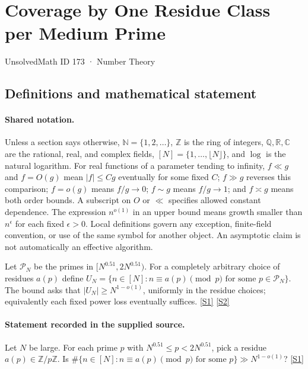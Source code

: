 \documentclass[11pt,a4paper]{article}
\newcommand{\N}{\mathbb{N}}
\newcommand{\Z}{\mathbb{Z}}
\newcommand{\Q}{\mathbb{Q}}
\newcommand{\R}{\mathbb{R}}
\newcommand{\C}{\mathbb{C}}
\newcommand{\sref}[2]{\hyperlink{source:#1:#2}{[S#2]}}
\begin{document}

\setcounter{section}{172}

\section{Coverage by One Residue Class per Medium Prime}\label{173}

{\small\sffamily UnsolvedMath ID 173 · Number Theory}

\subsection{Definitions and mathematical statement}

\paragraph{Shared notation.}Unless a section says otherwise, $\N=\{1,2,\ldots\}$,
$\Z$ is the ring of integers, $\Q,\R,\C$ are the rational, real, and complex
fields, $[N]=\{1,\ldots,\lfloor N\rfloor\}$, and $\log$ is the natural
logarithm. For real functions of a parameter tending to infinity,
$f\ll g$ and $f=O(g)$ mean $|f|\leq Cg$ eventually for some fixed $C$;
$f\gg g$ reverses this comparison; $f=o(g)$ means $f/g\to0$;
$f\sim g$ means $f/g\to1$; and $f\asymp g$ means both order bounds.
A subscript on $O$ or $\ll$ specifies allowed constant dependence.
The expression $n^{o(1)}$ in an upper bound means growth smaller than
$n^\epsilon$ for each fixed $\epsilon>0$. Local definitions govern any
exception, finite-field convention, or use of the same symbol for another
object. An asymptotic claim is not automatically an effective algorithm.



Let $\mathcal P_N$ be the primes in $[N^{0.51},2N^{0.51})$. For a completely arbitrary choice of residues $a(p)$ define $U_N=\{n\in[N]:n\equiv a(p)\pmod p\text{ for some }p\in\mathcal P_N\}$. The bound asks that $|U_N|\geq N^{1-o(1)}$, uniformly in the residue choices; equivalently each fixed power loss eventually suffices. \sref{173}{1} \sref{173}{2}

\paragraph{Statement recorded in the supplied source.}
Let $N$ be large. For each prime $p$ with $N^{0.51} \leq p < 2N^{0.51}$, pick a residue $a(p) \in \mathbb{Z}/p\mathbb{Z}$. Is $\#\{n \in [N] : n \equiv a(p) \pmod p \text{ for some } p\} \gg N^{1-o(1)}$? \sref{173}{1}
\end{document}
